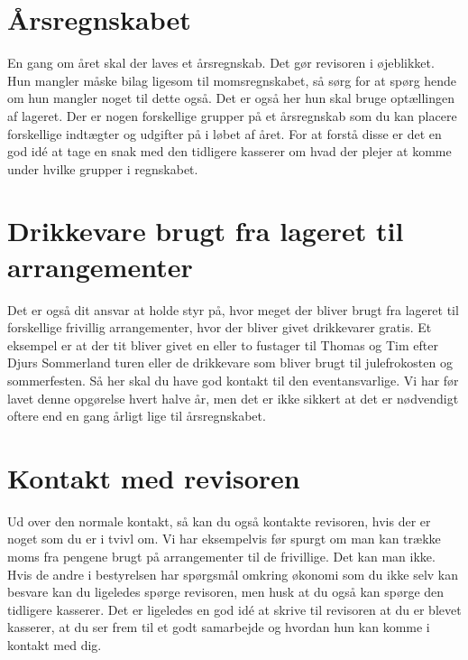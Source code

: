 \section{Årsregnskabet}
En gang om året skal der laves et årsregnskab. Det gør revisoren i øjeblikket. Hun mangler måske bilag ligesom til momsregnskabet, så sørg for at spørg hende om hun mangler noget til dette også. Det er også her hun skal bruge optællingen af lageret. Der er nogen forskellige grupper på et årsregnskab som du kan placere forskellige indtægter og udgifter på i løbet af året. For at forstå disse er det en god idé at tage en snak med den tidligere kasserer om hvad der plejer at komme under hvilke grupper i regnskabet.

\section{Drikkevare brugt fra lageret til arrangementer}
Det er også dit ansvar at holde styr på, hvor meget der bliver brugt fra lageret til forskellige frivillig arrangementer, hvor der bliver givet drikkevarer gratis. Et eksempel er at der tit bliver givet en eller to fustager til Thomas og Tim efter Djurs Sommerland turen eller de drikkevare som bliver brugt til julefrokosten og sommerfesten. Så her skal du have god kontakt til den eventansvarlige. Vi har før lavet denne opgørelse hvert halve år, men det er ikke sikkert at det er nødvendigt oftere end en gang årligt lige til årsregnskabet.

\section{Kontakt med revisoren}
Ud over den normale kontakt, så kan du også kontakte revisoren, hvis der er noget som du er i tvivl om. Vi har eksempelvis før spurgt om man kan trække moms fra pengene brugt på arrangementer til de frivillige. Det kan man ikke. Hvis de andre i bestyrelsen har spørgsmål omkring økonomi som du ikke selv kan besvare kan du ligeledes spørge revisoren, men husk at du også kan spørge den tidligere kasserer. Det er ligeledes en god idé at skrive til revisoren at du er blevet kasserer, at du ser frem til et godt samarbejde og hvordan hun kan komme i kontakt med dig.


